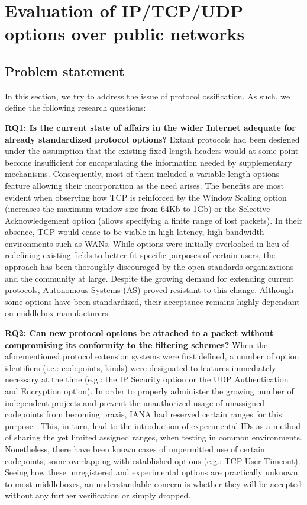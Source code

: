 \section{Evaluation of IP/TCP/UDP options over public networks}
\label{extend:ops}

\subsection{Problem statement}
\label{extend:ops:intro}

In this section, we try to address the issue of protocol ossification. As such,
we define the following research questions:

\textbf{RQ1: Is the current state of affairs in the wider Internet adequate for already standardized protocol options?}
Extant protocols had been designed under the assumption that the existing fixed-length headers would at some point become insufficient for encapsulating the information needed by supplementary mechanisms. Consequently, most of them included a variable-length options feature allowing their incorporation as the need arises. The benefits are most evident when observing how TCP is reinforced by the Window Scaling option (increases the maximum window size from 64Kb to 1Gb) or the Selective Acknowledgement option (allows specifying a finite range of lost packets). In their absence, TCP would cease to be viable in high-latency, high-bandwidth environments such as WANs. While options were initially overlooked in lieu of redefining existing fields to better fit specific purposes of certain users, the approach has been thoroughly discouraged by the open standards organizations and the community at large. Despite the growing demand for extending current protocols, Autonomous Systems (AS) proved resistant to this change. Although some options have been standardized, their acceptance remains highly dependant on middlebox manufacturers.

\textbf{RQ2: Can new protocol options be attached to a packet without compromising its conformity to the filtering schemes?}
When the aforementioned protocol extension systems were first defined, a number of option identifiers (i.e.: codepoints, kinds) were designated to features immediately necessary at the time (e.g.: the IP Security option or the UDP Authentication and Encryption option). In order to properly administer the growing number of independent projects and prevent the unauthorized usage of unassigned codepoints from becoming praxis, IANA had reserved certain ranges for this purpose \cite{fenner2006experimental}. This, in turn, lead to the introduction of experimental IDs \cite{touch2013shared} as a method of sharing the yet limited assigned ranges, when testing in common environments. Nonetheless, there have been known cases of unpermitted use of certain codepoints, some overlapping with established options (e.g.: TCP User Timeout). Seeing how these unregistered and experimental options are practically unknown to most middleboxes, an understandable concern is whether they will be accepted without any further verification or simply dropped.

